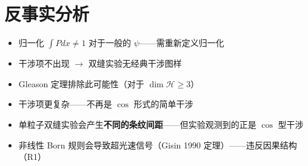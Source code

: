 \section*{反事实分析}

\begin{limitbox}[若概率是振幅的模而非模方（$P = |\langle a|\psi\rangle|$）]
  \begin{itemize}
    \item 归一化 $\int P dx \neq 1$ 对于一般的 $\psi$——需重新定义归一化
    \item 干涉项不出现 $\to$ 双缝实验无经典干涉图样
    \item Gleason 定理排除此可能性（对于 $\dim\mathcal{H} \ge 3$）
  \end{itemize}
\end{limitbox}

\begin{limitbox}[若概率是振幅的四次方（$P = |\langle a|\psi\rangle|^4$）]
  \begin{itemize}
    \item 干涉项更复杂——不再是 $\cos$ 形式的简单干涉
    \item 单粒子双缝实验会产生\textbf{不同的条纹间距}——但实验观测到的正是 $\cos$ 型干涉
    \item 非线性 Born 规则会导致超光速信号（Gisin 1990 定理）——违反因果结构（R1）
  \end{itemize}
\end{limitbox}
